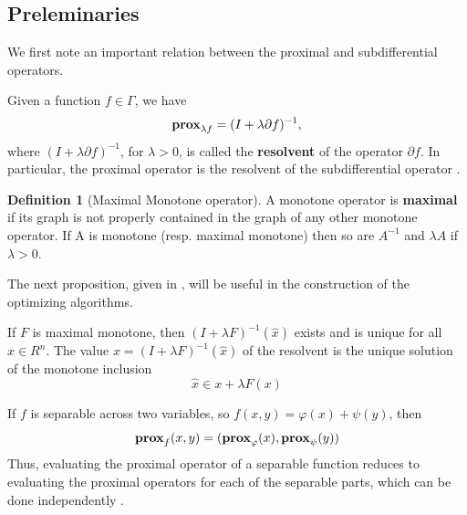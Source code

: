 \documentclass{article}
\theoremstyle{definition}
\newtheorem{definition}{Definition}
\theoremstyle{remark}
\begin{document}
\subsection{Preleminaries}%
  \label{sub:Preleminaries}
  We first note an important relation between the proximal and subdifferential operators.\\
  \begin{proposition}
    Given a function $f\in\Gamma$, we have 
    \begin{equation}\label{subProx}
      \operatorname{\mathbf{prox}}_{\lambda f} =(I+ \lambda \partial f)^{-1},
    \end{equation}  
    where $(I + \lambda \partial f)^{-1}$, for $\lambda > 0$, is called the \textbf{resolvent} of the operator $\partial f$. In particular, the proximal operator is the resolvent of the subdifferential operator \cite{parikh_2014}.\\
  \end{proposition}
  \begin{definition}[Maximal Monotone operator]
    A monotone operator is \textbf{maximal} if its graph is not properly contained in the graph of any other monotone operator. If A is monotone (resp. maximal monotone) then so are $A^{-1}$ and $\lambda A$ if $\lambda > 0$.
  \end{definition}
  The next proposition, given in \cite{ConnorVander}, will be useful in the construction of the optimizing algorithms.\\ 
  \begin{proposition}     
If $F$ is maximal monotone, then $(I + \lambda F)^{-1}(\hat x)$ exists and is unique for all $\hat x \in R^n$. The value $x = (I + \lambda F)^{-1}(\hat x)$ of the resolvent is the unique solution of the monotone inclusion
    \begin{equation}\label{maxmon}
      \hat x \in x + \lambda {F}(x) 
   \end{equation}
  \end{proposition}  
\begin{proposition} \label{proxsplit}
  If $f$ is separable across two variables, so $f(x, y) = \varphi(x) + \psi(y)$, then
  \begin{equation}
    \operatorname{\mathbf{prox}}_f (x,y) = (\operatorname{\mathbf{prox}}_\varphi(x), \operatorname{\mathbf{prox}}_\psi(y))
  \end{equation}
  Thus, evaluating the proximal operator of a separable function reduces to evaluating the proximal operators for each of the separable parts, which can be done independently \cite{parikh_2014}.
\end{proposition}
\end{document}
